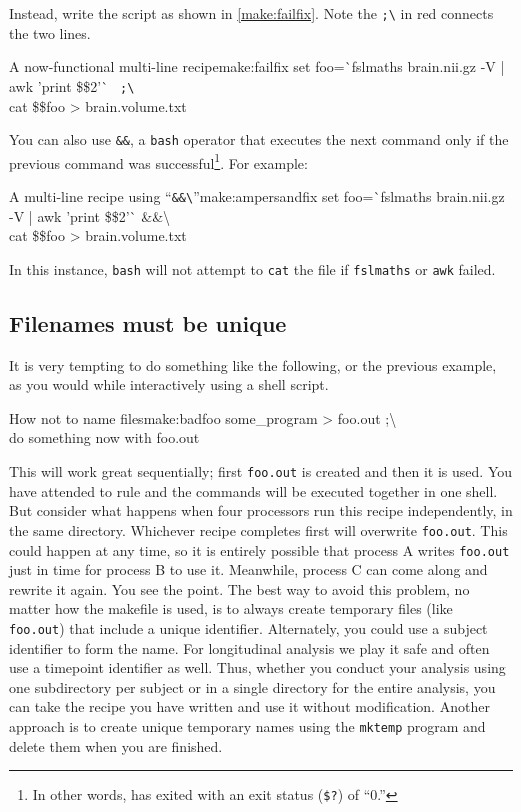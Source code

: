 Instead, write the script as shown in \autoref{make:failfix}. Note the \texttt{;\textbackslash} in red connects the two lines.
\begin{make}{A now-functional multi-line recipe}{make:failfix}
	set foo=\`{}fslmaths brain.nii.gz -V | awk '{print \$\$2}'\`{} \texttt{{\color{red} ;\textbackslash}} \\
	cat \$\$foo > brain.volume.txt
\end{make}

You can also use \texttt{\&\&}, a \texttt{bash} operator that executes the next command only if the previous command was successful\footnote{In other words, has exited with an exit status (\texttt{\$?}) of ``0.''}. For example:
\begin{make}{A multi-line recipe using ``\texttt{\&\&\textbackslash}''}{make:ampersandfix}
	set foo=\`{}fslmaths brain.nii.gz -V | awk '{print \$\$2}'\`{} \&\&\textbackslash\\
	cat \$\$foo > brain.volume.txt
\end{make}

In this instance, \texttt{bash} will not attempt to \texttt{cat} the file if \texttt{fslmaths} or \texttt{awk} failed.

\subsection{Filenames must be unique}

It is very tempting to do something like the following, or the previous example, as  you would while interactively using a shell script.
\begin{make}{How not to name files}{make:badfoo}
	some_program > foo.out ;\textbackslash \\
	do something \dd now \dd with foo.out
\end{make}

This will work great sequentially; first \texttt{foo.out} is created and then it is used. You have attended to rule  and the commands will be executed together in one shell. But consider what happens when four processors run this recipe independently, in the same directory. Whichever recipe completes first will overwrite \texttt{foo.out}. This could happen at any time, so it is entirely possible that process A writes \texttt{foo.out} just in time for process B to use it. Meanwhile, process C can come along and rewrite it again. You see the point. The best way to avoid this problem, no matter how the makefile is used, is to always create temporary files (like \texttt{foo.out}) that include a unique identifier.  Alternately, you could use a subject identifier to form the name. For longitudinal analysis we play it safe and often use a timepoint identifier as well. Thus, whether you conduct your analysis using one subdirectory per subject or in a single directory for the entire analysis, you can take the recipe you have written and use it without modification. Another approach is to create unique temporary names using the \texttt{mktemp} program and delete them when you are finished. 

